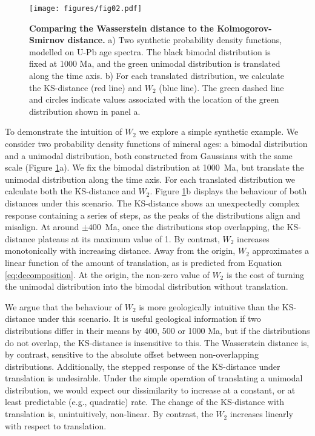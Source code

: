 \documentclass[gchron, manuscript]{copernicus}
\begin{document}
\begin{figure}
    \centering
    \texttt{[image: figures/fig02.pdf]}
    \caption{\textbf{Comparing the Wasserstein distance to the Kolmogorov-Smirnov distance.} a) Two synthetic probability density functions, modelled on U-Pb age spectra. The black bimodal distribution is fixed at 1000 Ma, and the green unimodal distribution is translated along the time axis. b) For each translated distribution, we calculate the KS-distance (red line) and $W_2$ (blue line). The green dashed line and circles indicate values associated with the location of the green distribution shown in panel a.}
    \label{fig:translation}
\end{figure}

To demonstrate the intuition of $W_2$ we explore a simple synthetic example. We consider two probability density functions of mineral ages: a bimodal distribution and a unimodal distribution, both constructed from Gaussians with the same scale (Figure \ref{fig:translation}a). We fix the bimodal distribution at 1000~Ma, but translate the unimodal distribution along the time axis. For each translated distribution we calculate both the KS-distance and $W_2$. Figure \ref{fig:translation}b displays the behaviour of both distances under this scenario. The KS-distance shows an unexpectedly complex response containing a series of steps, as the peaks of the distributions align and misalign. At around $\pm{400}$~Ma, once the distributions stop overlapping, the KS-distance plateaus at its maximum value of 1. By contrast, $W_2$ increases monotonically with increasing distance. Away from the origin, $W_2$ approximates a linear function of the amount of translation, as is predicted from Equation \ref{eq:decomposition}. At the origin, the non-zero value of $W_2$ is the cost of turning the unimodal distribution into the bimodal distribution without translation. 

We argue that the behaviour of $W_2$ is more geologically intuitive than the KS-distance under this scenario. It is useful geological information if two distributions differ in their means by 400, 500 or 1000 Ma, but if the distributions do not overlap, the KS-distance is insensitive to this. The Wasserstein distance is, by contrast, sensitive to the absolute offset between non-overlapping distributions. Additionally, the stepped response of the KS-distance under translation is undesirable. Under the simple operation of translating a unimodal distribution, we would expect our dissimilarity to increase at a constant, or at least predictable (e.g., quadratic) rate. The change of the KS-distance with translation is, unintuitively, non-linear. By contrast, the $W_2$ increases linearly with respect to translation.
\end{document}
